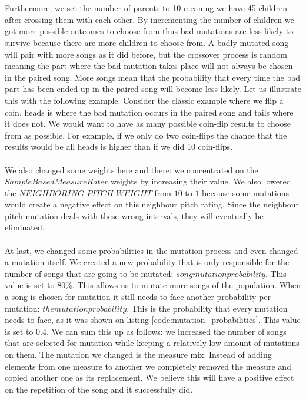 \documentclass[a4paper]{article}
\begin{document}
\\\\
Furthermore, we set the number of parents to 10 meaning we have 45 children after crossing them with each other. By incrementing the number of children we got more possible outcomes to choose from thus bad mutations are less likely to survive because there are more children to choose from. A badly mutated song will pair with more songs as it did before, but the crossover process is random meaning the part where the bad mutation takes place will not always be chosen in the paired song. More songs mean that the probability that every time the bad part has been ended up in the paired song will become less likely. Let us illustrate this with the following example. Consider the classic example where we flip a coin, heads is where the bad mutation occurs in the paired song and tails where it does not. We would want to have as many possible coin-flip results to choose from as possible. For example, if we only do two coin-flips the chance that the results would be all heads is higher than if we did 10 coin-flips.
\\\\
We also changed some weights here and there: we concentrated on the $SampleBasedMeasureRater$ weights by increasing their value. We also lowered the $NEIGHBORING\_PITCH\_WEIGHT$ from $10$ to $1$ because some mutations would create a negative effect on this neighbour pitch rating. Since the neighbour pitch mutation deals with these wrong intervals, they will eventually be eliminated.
\\\\
At last, we changed some probabilities in the mutation process and even changed a mutation itself. We created a new probability that is only responsible for the number of songs that are going to be mutated: $song mutation probability$. This value is set to 80\%. This allows us to mutate more songs of the population. When a song is chosen for mutation it still needs to face another probability per mutation: $the mutation probability$. This is the probability that every mutation needs to face, as it was shown on listing \ref{code:mutation_probabilities}. This value is set to 0.4. We can sum this up as follows: we increased the number of songs that are selected for mutation while keeping a relatively low amount of mutations on them. The mutation we changed is the measure mix. Instead of adding elements from one measure to another we completely removed the measure and copied another one as its replacement. We believe this will have a positive effect on the repetition of the song and it successfully did.
\end{document}
